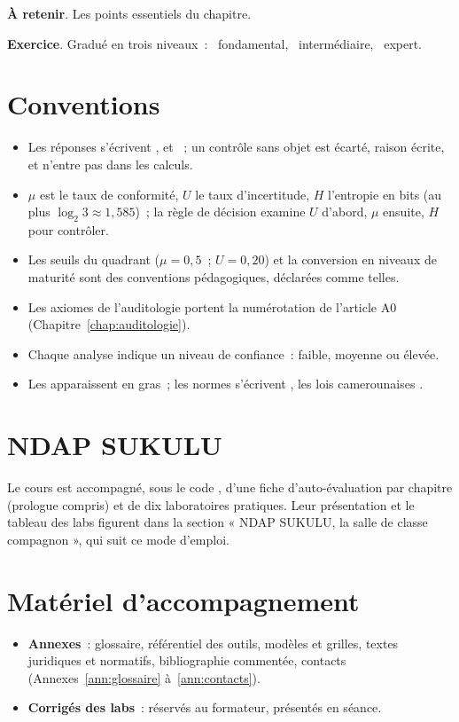 \begin{boxresume}
\textbf{À retenir}. Les points essentiels du chapitre.
\end{boxresume}

\begin{boxexo}
\textbf{Exercice}. Gradué en trois niveaux~: \niveaubase\ fondamental,
\niveaumoyen\ intermédiaire, \niveauexpert\ expert.
\end{boxexo}

\section*{Conventions}

\begin{itemize}
    \item Les réponses s'écrivent \OUI{}, \NON{} et \NEK{}~; un contrôle sans
          objet est écarté, raison écrite, et n'entre pas dans les calculs.
    \item $\mu$ est le taux de conformité, $U$ le taux d'incertitude, $H$
          l'entropie en bits (au plus $\log_2 3 \approx 1{,}585$)~; la règle
          de décision examine $U$ d'abord, $\mu$ ensuite, $H$ pour contrôler.
    \item Les seuils du quadrant ($\mu = 0{,}5$~; $U = 0{,}20$) et la
          conversion en niveaux de maturité sont des conventions
          pédagogiques, déclarées comme telles.
    \item Les axiomes de l'auditologie portent la numérotation de l'article
          A0 (Chapitre~\ref{chap:auditologie}).
    \item Chaque analyse indique un niveau de confiance~: faible, moyenne ou
          élevée.
    \item Les  apparaissent en gras~; les normes
          s'écrivent , les lois camerounaises
          .
\end{itemize}

\section*{NDAP SUKULU}

Le cours est accompagné, sous le code \codeUE, d'une fiche
d'auto-évaluation par chapitre (prologue compris) et de dix laboratoires
pratiques. Leur présentation et le tableau des labs figurent dans la section
« NDAP SUKULU, la salle de classe compagnon », qui suit ce mode d'emploi.

\section*{Matériel d'accompagnement}

\begin{itemize}
    \item \textbf{Annexes}~: glossaire, référentiel des outils, modèles et
          grilles, textes juridiques et normatifs, bibliographie commentée,
          contacts (Annexes~\ref{ann:glossaire} à~\ref{ann:contacts}).
    \item \textbf{Corrigés des labs}~: réservés au formateur, présentés en
          séance.
\end{itemize}
